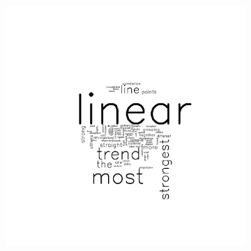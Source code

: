 \documentclass[11pt]{isuthesis}\usepackage[]{graphicx}\usepackage[]{color}
\begin{document}
\begin{figure}[ht]
\begin{subfigure}[t]{0.32\linewidth}
  \includegraphics[width=.75\linewidth]{fig-sentiment-9}
\end{subfigure}


\end{figure}
\end{document}
